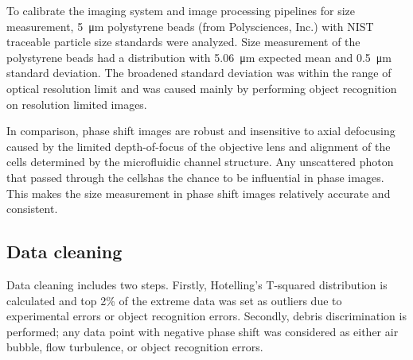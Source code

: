 \documentclass[aps,pra,reprint,longbibliography,superscriptaddress]{revtex4-1}
\begin{document}
To calibrate the imaging system and image processing pipelines for size measurement, \SI{5}{\micro\meter} polystyrene beads (from Polysciences, Inc.) with NIST traceable particle size standards were analyzed. Size measurement of the polystyrene beads had a distribution with \SI{5.06}{\micro\meter} expected mean and \SI{0.5}{\micro\meter} standard deviation. The broadened standard deviation was within the range of optical resolution limit and was caused mainly by performing object recognition on resolution limited images.

In comparison, phase shift images are robust and insensitive to axial defocusing \cite{spadinger1990effect} caused by the limited depth-of-focus of the objective lens and alignment of the cells determined by the microfluidic channel structure. Any unscattered photon that passed through the cellshas the chance to be influential in phase images. This makes the size measurement in phase shift images relatively accurate and consistent. 

\subsection{Data cleaning}

Data cleaning includes two steps. Firstly, Hotelling's T-squared distribution is calculated and top 2\% of the extreme data was set as outliers due to experimental errors or object recognition errors. Secondly, debris discrimination is performed; any data point with negative phase shift was considered as either air bubble, flow turbulence, or object recognition errors.




\end{document}
